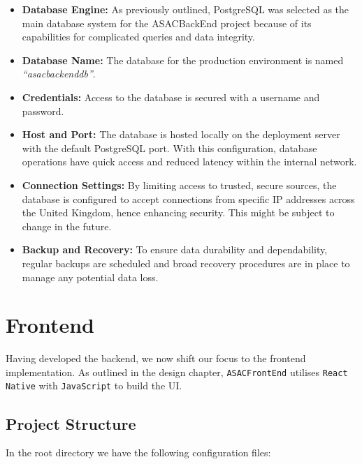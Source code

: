 \begin{itemize}
    \item \textbf{Database Engine:} As previously outlined, PostgreSQL was selected as the main database system for the ASACBackEnd project because of its capabilities for complicated queries and data integrity.
    \item \textbf{Database Name:} The database for the production environment is named \textit{``asacbackenddb''}.
    \item \textbf{Credentials:} Access to the database is secured with a username and password.
    \item \textbf{Host and Port:} The database is hosted locally on the deployment server with the default PostgreSQL port. With this configuration, database operations have quick access and reduced latency within the internal network.
    \item \textbf{Connection Settings:} By limiting access to trusted, secure sources, the database is configured to accept connections from specific IP addresses across the United Kingdom, hence enhancing security. This might be subject to change in the future.
    \item \textbf{Backup and Recovery:} To ensure data durability and dependability, regular backups are scheduled and broad recovery procedures are in place to manage any potential data loss.
\end{itemize}

\section{Frontend}

Having developed the backend, we now shift our focus to the frontend implementation. As outlined in the design chapter, \texttt{ASACFrontEnd} utilises \texttt{React Native} with \texttt{JavaScript} to build the UI. 

\subsection{Project Structure}

In the root directory we have the following configuration files:

